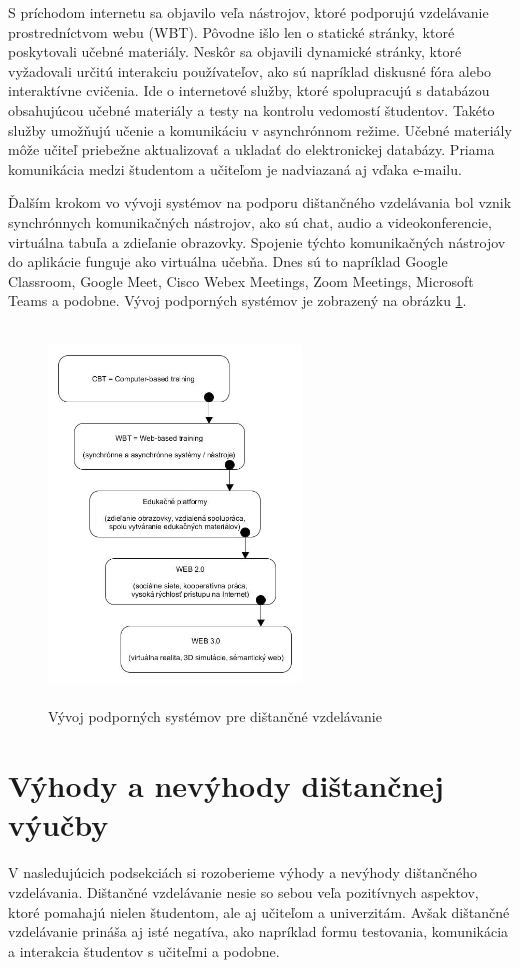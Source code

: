 \documentclass[10pt,oneside,slovak,a4paper]{article}
\begin{document}
S príchodom internetu sa objavilo veľa nástrojov, ktoré podporujú vzdelávanie prostredníctvom webu (WBT).
Pôvodne išlo len o statické stránky, ktoré poskytovali učebné materiály.
Neskôr sa objavili dynamické stránky, ktoré vyžadovali určitú interakciu používateľov, ako sú napríklad diskusné fóra alebo interaktívne cvičenia.
Ide o internetové služby, ktoré spolupracujú s databázou obsahujúcou učebné materiály a testy na kontrolu vedomostí študentov.
Takéto služby umožňujú učenie a komunikáciu v asynchrónnom režime. Učebné materiály môže učiteľ priebežne aktualizovať a ukladať do elektronickej databázy.
Priama komunikácia medzi študentom a učiteľom je nadviazaná aj vďaka e-mailu.

Ďalším krokom vo vývoji systémov na podporu dištančného vzdelávania bol vznik synchrónnych komunikačných nástrojov, ako sú chat, audio a videokonferencie, virtuálna tabuľa a zdieľanie obrazovky.
Spojenie týchto komunikačných nástrojov do aplikácie funguje ako virtuálna učebňa.
Dnes sú to napríklad Google Classroom, Google Meet, Cisco Webex Meetings, Zoom Meetings, Microsoft Teams a podobne.
Vývoj podporných systémov je zobrazený na obrázku \ref{Vyvoj_podp_sys_DE}.

\begin{figure}[h]
	\centering
	\includegraphics[scale=0.15, height=100mm,width=0.6\textwidth]{Dev_Of_SupSys_DE.jpg}
	\caption{Vývoj podporných systémov pre dištančné vzdelávanie\cite{WiktorzakKotowski}}
	\label{Vyvoj_podp_sys_DE}
\end{figure}

\section{Výhody a nevýhody dištančnej výučby}
V nasledujúcich podsekciách si rozoberieme výhody a nevýhody dištančného vzdelávania\cite{Sokolova2018}.
Dištančné vzdelávanie nesie so sebou veľa pozitívnych aspektov, ktoré pomahajú nielen študentom, ale aj učiteľom a univerzitám.
Avšak dištančné vzdelávanie prináša aj isté negatíva, ako napríklad formu testovania, komunikácia a interakcia študentov s učiteľmi a podobne. 
\end{document}
